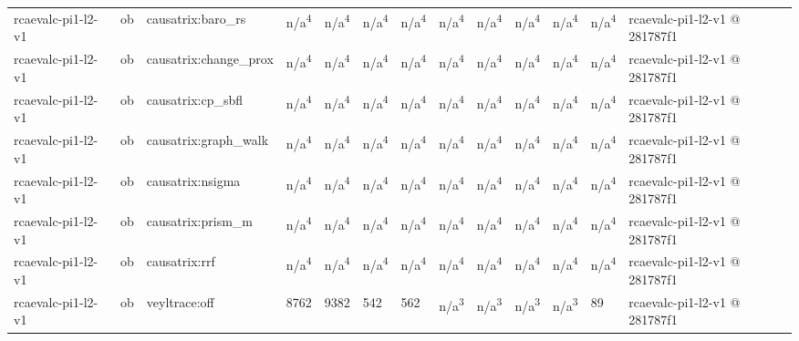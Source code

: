 \begin{table}[t]
\begin{tabular}{lllllllllllll}
rcaevalc-pi1-l2-v1 & ob & causatrix:baro\_rs & n/a\textsuperscript{4} & n/a\textsuperscript{4} & n/a\textsuperscript{4} & n/a\textsuperscript{4} & n/a\textsuperscript{4} & n/a\textsuperscript{4} & n/a\textsuperscript{4} & n/a\textsuperscript{4} & n/a\textsuperscript{4} & rcaevalc-pi1-l2-v1 @ 281787f1 \\
rcaevalc-pi1-l2-v1 & ob & causatrix:change\_prox & n/a\textsuperscript{4} & n/a\textsuperscript{4} & n/a\textsuperscript{4} & n/a\textsuperscript{4} & n/a\textsuperscript{4} & n/a\textsuperscript{4} & n/a\textsuperscript{4} & n/a\textsuperscript{4} & n/a\textsuperscript{4} & rcaevalc-pi1-l2-v1 @ 281787f1 \\
rcaevalc-pi1-l2-v1 & ob & causatrix:cp\_sbfl & n/a\textsuperscript{4} & n/a\textsuperscript{4} & n/a\textsuperscript{4} & n/a\textsuperscript{4} & n/a\textsuperscript{4} & n/a\textsuperscript{4} & n/a\textsuperscript{4} & n/a\textsuperscript{4} & n/a\textsuperscript{4} & rcaevalc-pi1-l2-v1 @ 281787f1 \\
rcaevalc-pi1-l2-v1 & ob & causatrix:graph\_walk & n/a\textsuperscript{4} & n/a\textsuperscript{4} & n/a\textsuperscript{4} & n/a\textsuperscript{4} & n/a\textsuperscript{4} & n/a\textsuperscript{4} & n/a\textsuperscript{4} & n/a\textsuperscript{4} & n/a\textsuperscript{4} & rcaevalc-pi1-l2-v1 @ 281787f1 \\
rcaevalc-pi1-l2-v1 & ob & causatrix:nsigma & n/a\textsuperscript{4} & n/a\textsuperscript{4} & n/a\textsuperscript{4} & n/a\textsuperscript{4} & n/a\textsuperscript{4} & n/a\textsuperscript{4} & n/a\textsuperscript{4} & n/a\textsuperscript{4} & n/a\textsuperscript{4} & rcaevalc-pi1-l2-v1 @ 281787f1 \\
rcaevalc-pi1-l2-v1 & ob & causatrix:prism\_m & n/a\textsuperscript{4} & n/a\textsuperscript{4} & n/a\textsuperscript{4} & n/a\textsuperscript{4} & n/a\textsuperscript{4} & n/a\textsuperscript{4} & n/a\textsuperscript{4} & n/a\textsuperscript{4} & n/a\textsuperscript{4} & rcaevalc-pi1-l2-v1 @ 281787f1 \\
rcaevalc-pi1-l2-v1 & ob & causatrix:rrf & n/a\textsuperscript{4} & n/a\textsuperscript{4} & n/a\textsuperscript{4} & n/a\textsuperscript{4} & n/a\textsuperscript{4} & n/a\textsuperscript{4} & n/a\textsuperscript{4} & n/a\textsuperscript{4} & n/a\textsuperscript{4} & rcaevalc-pi1-l2-v1 @ 281787f1 \\
rcaevalc-pi1-l2-v1 & ob & veyltrace:off & 8762 & 9382 & 542 & 562 & n/a\textsuperscript{3} & n/a\textsuperscript{3} & n/a\textsuperscript{3} & n/a\textsuperscript{3} & 89 & rcaevalc-pi1-l2-v1 @ 281787f1 \\

\end{tabular}
\end{table}
